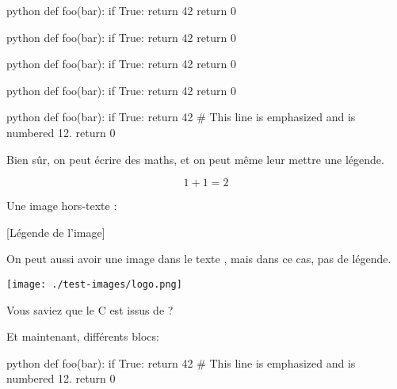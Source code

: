 \documentclass[small]{zmdocument}
\begin{document}
\begin{CodeBlock}{python}
def foo(bar):
    if True:
        return 42
    return 0
\end{CodeBlock}

\begin{CodeBlock}{python}
def foo(bar):
    if True:
        return 42
    return 0
\end{CodeBlock}

\begin{CodeBlock}{python}
def foo(bar):
    if True:
        return 42
    return 0
\end{CodeBlock}

\begin{CodeBlock}[][1, 3-4]{python}
def foo(bar):
    if True:
        return 42
    return 0
\end{CodeBlock}

\begin{CodeBlock}[][12][10]{python}
def foo(bar):
    if True:
        return 42 # This line is emphasized and is numbered 12.
    return 0
\end{CodeBlock}

Bien sûr, on peut écrire des maths, et on peut même leur mettre une légende.

\[
   1 + 1 = 2
\]

Une image hors-texte :

[Légende de l’image]

On peut aussi avoir une image dans le texte , mais dans ce cas, pas de légende.

\begin{center}
\texttt{[image: ./test-images/logo.png]}
\end{center}

Vous saviez que le C est issus de  ?


Et maintenant, différents blocs:

\begin{Information}
\blindtext
\begin{Question}
\blindtext
\end{Question}
\end{Information}

\begin{Question}
\blindtext
\begin{CodeBlock}[][12][10]{python}
def foo(bar):
    if True:
        return 42 # This line is emphasized and is numbered 12.
    return 0
\end{CodeBlock}
\blindtext
\end{Question}
\end{document}
